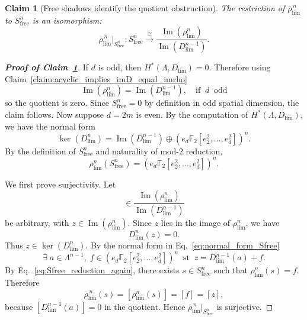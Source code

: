 \documentclass[aps,prx,reprint,superscriptaddress,twocolumn,amsmath,amssymb,amsfonts, nofootinbib]{revtex4-2}
\theoremstyle{apsstyle}
\newtheorem{claim}{Claim}
\begin{document}
\begin{claim}[Free shadows identify the quotient obstruction]
\label{claim:Sfree_quotient_iso}
The restriction of $\overline{\rho}_{\lim}^{\,n}$ to $S_{\mathrm{free}}^n$ is an isomorphism:
\begin{equation}
\overline{\rho}_{\lim}^{\,n}\big\vert_{S_{\mathrm{free}}^n}:
S_{\mathrm{free}}^n
\xrightarrow{\cong}
\frac{\operatorname{Im}(\rho_{\lim}^{n})}
{\operatorname{Im}(D_{\lim}^{n-1})}.
\end{equation}
\end{claim}

\begin{proof}[\textnormal{\textbf{Proof of Claim~\ref{claim:Sfree_quotient_iso}}}]
If $d$ is odd, then $H^{*}(\Lambda,D_{\lim})=0$. Therefore using Claim~\ref{claim:acyclic_implies_imD_equal_imrho}
\begin{equation*}
\operatorname{Im}(\rho_{\lim}^{n}) =
\operatorname{Im}(D_{\lim}^{n-1}),\quad \text{if}\;\; d\;\;\text{odd}
\end{equation*}
so the quotient is zero. Since $S_{\mathrm{free}}^n=0$ by definition in odd spatial dimension, the claim follows. Now suppose $d=2m$ is even. By the computation of $H^{*}(\Lambda,D_{\lim})$, we have the normal form
\begin{equation}
\ker(D_{\lim}^{n})
=
\operatorname{Im}(D_{\lim}^{n-1})
\oplus
\left(e_d\mathbb F_2[e_2^2,\dots,e_d^2]\right)^n.
\label{eq:normal_form_Sfree}
\end{equation}
By the definition of $S_{\mathrm{free}}^n$ and naturality of mod-$2$ reduction,
\begin{equation}
\rho_{\lim}^{n}(S_{\mathrm{free}}^n)
=
\left(e_d\mathbb F_2[e_2^2,\dots,e_d^2]\right)^n.
\label{eq:Sfree_reduction_again}
\end{equation}

\bigskip 

We first prove surjectivity. Let
\begin{equation}
[z]\in
\frac{\operatorname{Im}(\rho_{\lim}^{n})}
{\operatorname{Im}(D_{\lim}^{n-1})}
\end{equation}
be arbitrary, with $z\in \operatorname{Im}(\rho_{\lim}^{n})$. Since $z$ lies in the image of $\rho_{\lim}^{n}$, we have
\begin{equation}
D_{\lim}^{n}(z)=0.
\end{equation}
Thus $z\in\ker(D_{\lim}^{n})$. By the normal form in Eq.~\eqref{eq:normal_form_Sfree}
\begin{equation}
\exists\;a\in \Lambda^{n-1},\; f\in
\left(e_d\mathbb F_2[e_2^2,\dots,e_d^2]\right)^n\;\;\text{st}\;\;z=D_{\lim}^{n-1}(a)+f.
\end{equation}
By Eq.~\eqref{eq:Sfree_reduction_again}, there exists $s\in S_{\mathrm{free}}^n$ such that $\rho_{\lim}^{n}(s)=f$.
Therefore
\begin{equation}
\overline{\rho}_{\lim}^{\,n}(s)
=
[\rho_{\lim}^{n}(s)]
=
[f]
=
[z],
\end{equation}
because $[D_{\lim}^{n-1}(a)]=0$ in the quotient. Hence
$\overline{\rho}_{\lim}^{\,n}\big\vert_{S_{\mathrm{free}}^n}$ is surjective.


\end{proof}
\end{document}
